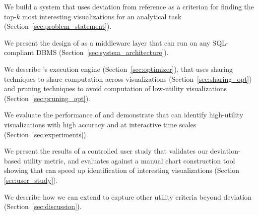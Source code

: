 \begin{denselist}
  \item We build a system that uses deviation from reference as a criterion for finding the
  top-$k$ most interesting visualizations for an analytical task (Section~\ref{sec:problem_statement}).

  \item We present the design of \SeeDB as a middleware layer that can run on any SQL-compliant DBMS 
  (Section~\ref{sec:system_architecture}).
  
  \item We describe \SeeDB's execution engine (Section~\ref{sec:optimizer}), that uses
  sharing techniques to share computation 
  across visualizations (Section~\ref{sec:sharing_opt}) and
  pruning techniques to avoid computation of low-utility visualizations
  (Section~\ref{sec:pruning_opt}).
  

  \item We evaluate the performance of \SeeDB and demonstrate that \SeeDB
  can identify high-utility visualizations with high accuracy and at interactive time scales
  (Section~\ref{sec:experiments}).

  \item We present the results of a controlled user study that validates our deviation-based 
  utility metric, and evaluates \SeeDB against a manual chart construction tool 
  showing that \SeeDB can speed up identification of interesting 
  visualizations (Section \ref{sec:user_study}).

  \item We describe how we can extend \SeeDB to capture other utility criteria
  beyond deviation (Section~\ref{sec:discussion}).
\end{denselist}


